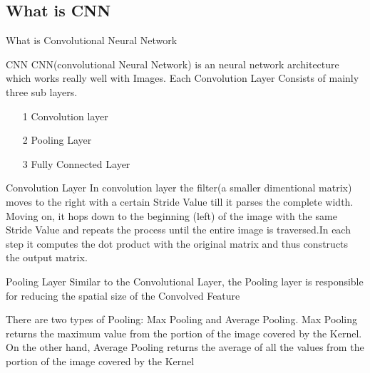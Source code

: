 \documentclass[10pt]{beamer}
\begin{document}
		\subsection{What is CNN}
			\begin{frame}{What is Convolutional Neural Network}
				\begin{block}{CNN}
					CNN(convolutional Neural Network) is an neural network architecture which works really well with Images. Each 								Convolution Layer Consists of mainly three sub layers.
				\end{block}
				\begin{itemize}
					\item[1] Convolution layer
					\item[2] Pooling Layer
					\item[3] Fully Connected Layer
				\end{itemize}
			\end{frame}
			\begin{frame}{Convolution Layer}
				In convolution layer the filter(a smaller dimentional matrix) moves to the right with a certain Stride Value till it parses the complete width. Moving on, it hops down to the beginning (left) of the image with the same Stride Value and repeats the process until the entire image is traversed.In each step it computes the dot product with the original matrix and thus constructs the output matrix.
				\transduration<0-8>{0}
			\end{frame}
			\begin{frame}{Pooling Layer}
				Similar to the Convolutional Layer, the Pooling layer is responsible for reducing the spatial size of the Convolved Feature

There are two types of Pooling: Max Pooling and Average Pooling. Max Pooling returns the maximum value from the portion of the image covered by the Kernel. On the other hand, Average Pooling returns the average of all the values from the portion of the image covered by the Kernel
				\transduration<0-8>{0}
			\end{frame}
\end{document}
